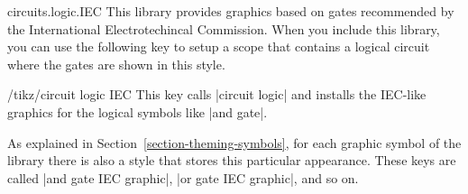 \begin{pgflibrary}{circuits.logic.IEC}
  This library provides graphics based on gates
  recommended by the International Electrotechincal Commission.  When
  you include this library, you can use the following key to 
  setup a scope that contains a logical circuit where the gates are  
  shown in this style.

  \begin{key}{/tikz/circuit logic IEC}
    This key calls |circuit logic| and installs the IEC-like
    graphics for the logical symbols like |and gate|.
  
    As explained in Section~\ref{section-theming-symbols}, for each
    graphic symbol of the library there is also a style that stores this
    particular appearance. These keys are called |and gate IEC graphic|,
    |or gate IEC graphic|, and so on.
\begin{codeexample}[]
\end{codeexample}
  \end{key}
\end{pgflibrary}

